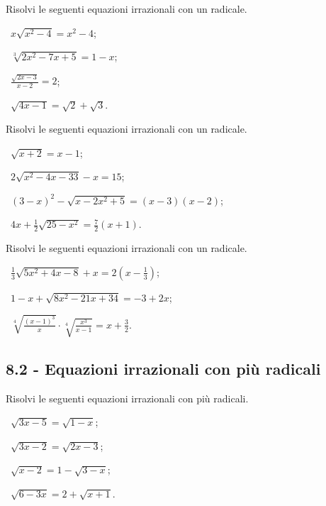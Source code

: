 \begin{esercizio}[\Ast]
 \label{ese:8.7}
Risolvi le seguenti equazioni irrazionali con un radicale.
\begin{multicols}{2}
 \begin{enumeratea}
 \item~$x\sqrt{x^2-4}=x^2-4$;
 \item~$\sqrt[3]{2x^2-7x+5}=1-x$;
 \item~$\frac{\sqrt{2x-3}}{x-2}=2$;
 \item~$\sqrt{4x-1}=\sqrt 2+\sqrt 3$.
 \end{enumeratea}
 \end{multicols}
\end{esercizio}
\pagebreak
\begin{esercizio}[\Ast]
 \label{ese:8.8}
Risolvi le seguenti equazioni irrazionali con un radicale.
\begin{multicols}{2}
 \begin{enumeratea}
 \item~$\sqrt{x+2}=x-1$;
 \item~$2\sqrt{x^2-4x-33}-x=15$;
 \item~$(3-x)^2-\sqrt{x-2x^2+5}=(x-3)(x-2)$;
 \item~$4x+\frac 1 2\sqrt{25-x^2}=\frac 7 2(x+1)$.
 \end{enumeratea}
 \end{multicols}
\end{esercizio}

\begin{esercizio}[\Ast]
 \label{ese:8.9}
Risolvi le seguenti equazioni irrazionali con un radicale.
\begin{multicols}{2}
 \begin{enumeratea}
 \item~$\frac 1 3\sqrt{5x^2+4x-8}+x=2\left(x-\frac 1 3\right)$;
 \item~$1-x+\sqrt{8x^2-21x+34}=-3+2x$;
 \item~$\sqrt[4]{\frac{(x-1)^3} x}\cdot \sqrt[4]{\frac{x^3}{x-1}}=x+\frac 3 2$.
 \end{enumeratea}
 \end{multicols}
\end{esercizio}

\subsection*{8.2 - Equazioni irrazionali con più radicali}

\begin{esercizio}[\Ast]
 \label{ese:8.10}
Risolvi le seguenti equazioni irrazionali con più radicali.
\begin{multicols}{2}
 \begin{enumeratea}
 \item~$\sqrt{3x-5}=\sqrt{1-x}$;
 \item~$\sqrt{3x-2}=\sqrt{2x-3}$;
 \item~$\sqrt{x-2}=1-\sqrt{3-x}$;
 \item~$\sqrt{6-3x}=2+\sqrt{x+1}$.
 \end{enumeratea}
 \end{multicols}
\end{esercizio}

